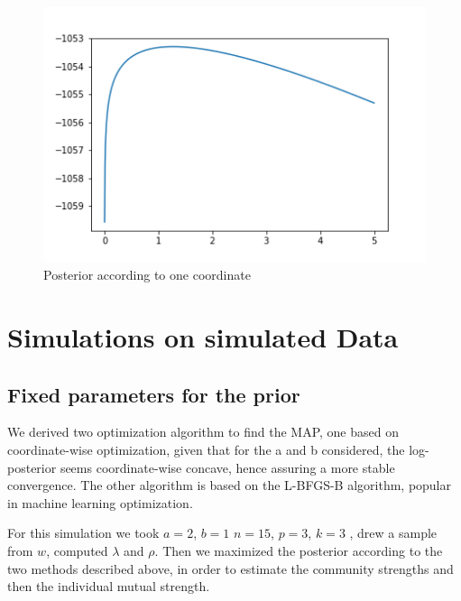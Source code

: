 \documentclass[12pt]{ociamthesis}  %
\begin{document}
	\begin{figure}
		\centering
		\includegraphics[width=\textwidth,height=\textheight,keepaspectratio]{CoordinateWiseFunction}
		\caption{Posterior according to one coordinate}
	\end{figure}
	
	\section{Simulations on simulated Data}
	\subsection{Fixed parameters for the prior}
	We derived two optimization algorithm to find the MAP, one based on coordinate-wise optimization, given that for the a and b considered, the log-posterior seems coordinate-wise concave, hence assuring a more stable convergence. The other algorithm is based on the L-BFGS-B algorithm, popular in machine learning optimization.
	
	For this simulation we took $a = 2$, $b = 1$ $n = 15$, $p = 3$, $k = 3$ , drew a sample from $w$, computed $\lambda$ and $\rho$. Then we maximized the posterior according to the two methods described above, in order to estimate the community strengths and then the individual mutual strength. 
\end{document}
